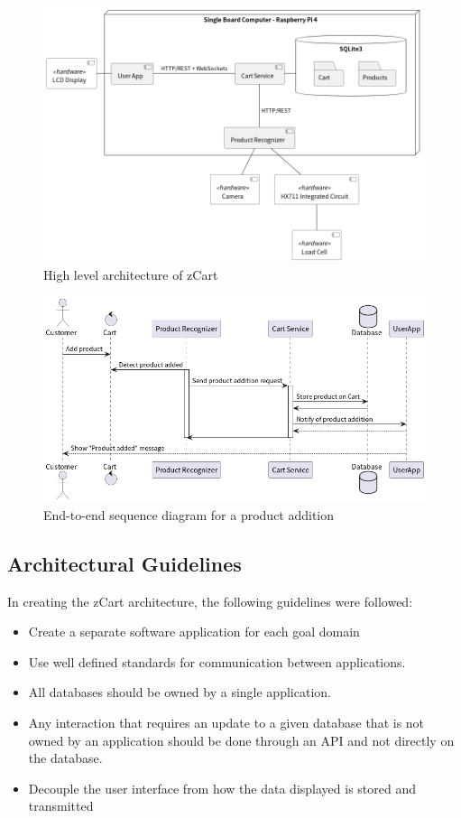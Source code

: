 \documentclass[openright]{normas-utf-tex} %
\begin{document}
\begin{figure}[H]
	\centering
	\includegraphics[width=1\textwidth]{./images/zCart.png}
	\caption[High level architecture of zCart]{High level architecture of zCart}
	\label{fig:architecture}
\end{figure}

\begin{figure}[H]
	\centering
	\includegraphics[width=1\textwidth]{./images/E2E.png}
	\caption[End-to-end sequence diagram for a product addition]{End-to-end sequence diagram for a product addition}
	\label{fig:e2eseq}
\end{figure}

\subsection{Architectural Guidelines}
In creating the zCart architecture, the following guidelines were followed:

\begin{itemize}
    \item Create a separate software application for each goal domain
    \item Use well defined standards for communication between applications.
    \item All databases should be owned by a single application. 
    \item Any interaction that requires an update to a given database that is
        not owned by an application should be done through an API and not
        directly on the database.
    \item Decouple the user interface from how the data displayed is stored and transmitted
\end{itemize}
\end{document}
